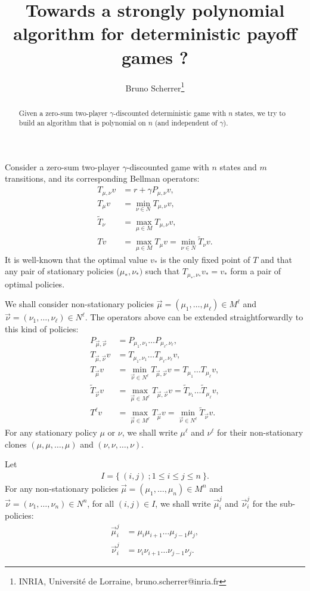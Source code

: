 \documentclass{article}
\title{Towards a strongly polynomial algorithm for deterministic payoff games ?}
\author{Bruno Scherrer\footnote{INRIA, Universit\'e de Lorraine, bruno.scherrer@inria.fr}}
\begin{document}
\maketitle

\begin{abstract}
  Given a zero-sum two-player $\gamma$-discounted deterministic game with $n$ states, we try to build an algorithm that is polynomial on $n$ (and independent of $\gamma$).
\end{abstract}

Consider a zero-sum two-player $\gamma$-discounted game with $n$ states and $m$ transitions, and its corresponding Bellman operators:
\begin{align}
  T_{\mu,\nu}v & = r + \gamma P_{\mu,\nu}v, \\
  T_{\mu}v & = \min_{\nu \in N} T_{\mu,\nu}v, \\
  \tilde T_{\nu} & = \max_{\mu \in M} T_{\mu,\nu}v, \\
  Tv & = \max_{\mu \in M} T_{\mu}v = \min_{\nu \in N} \tilde T_{\nu}v.
\end{align}
It is well-known that the optimal value $v_*$ is the only fixed point of $T$ and that any pair of stationary policies ($\mu_*,\nu_*)$ such that $T_{\mu_*,\nu_*}v_*=v_*$ form a pair of optimal policies.

We shall consider non-stationary policies $\vec\mu = (\mu_1,\dots,\mu_\ell) \in M^\ell$ and $\vec\nu = (\nu_1,\dots,\nu_\ell) \in N^\ell$. The operators above can be extended straightforwardly to this kind of policies:
\begin{align}
  P_{\vec\mu,\vec\nu} &= P_{\mu_1,\nu_1} \dots P_{\mu_\ell,\nu_\ell}, \\
  T_{\vec\mu,\vec\nu} v &= T_{\mu_1,\nu_1} \dots T_{\mu_\ell,\nu_\ell} v, \\
  T_{\vec\mu} v &= \min_{\vec\nu \in N^\ell} T_{\vec\mu,\vec\nu} v = T_{\mu_1} \dots T_{\mu_\ell} v, \\
  \tilde T_{\vec\nu} v &= \max_{\vec\mu \in M^\ell} T_{\vec\mu,\vec\nu} v = \tilde T_{\nu_1} \dots \tilde T_{\mu_\ell} v, \\
  T^\ell v & = \max_{\vec\mu \in M^\ell} T_{\vec\mu}v = \min_{\vec\nu \in N^\ell} \tilde T_{\vec\nu}v.
\end{align}
For any stationary policy $\mu$ or $\nu$, we shall write $\mu^\ell$ and $\nu^\ell$ for their non-stationary clones $(\mu,\mu,\dots,\mu)$ and $(\nu,\nu,\dots,\nu)$.

Let
\begin{align}
  I = \{~ (i,j) ~; 1 \le i \le j \le n ~\}.
\end{align}
For any non-stationary policies $\vec\mu = (\mu_1,\dots,\mu_n) \in M^n$ and $\vec\nu =(\nu_1,\dots,\nu_n) \in N^n$, for all $(i,j) \in I$, we shall write $\vec\mu_i^j$ and $\vec\nu_i^j$ for the sub-policies:
\begin{align}
  \vec\mu_i^j &= \mu_i \mu_{i+1} \dots \mu_{j-1} \mu_{j}, \\
  \vec\nu_i^j &= \nu_i \nu_{i+1} \dots \nu_{j-1} \nu_{j}.
\end{align}
\end{document}
